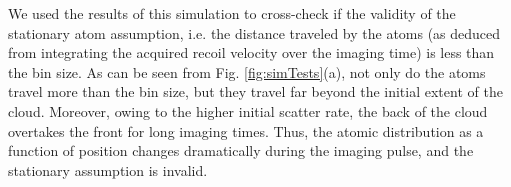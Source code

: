 \documentclass[12pt]{iopart}
\begin{document}
\par We used the results of this simulation to cross-check if the validity of the  stationary atom assumption, i.e. the distance traveled by the atoms (as deduced from integrating the acquired recoil velocity over the imaging time) is less than the bin size. As can be seen from Fig. \ref{fig:simTests}(a), not only do the atoms travel more than the bin size, but they travel far beyond the initial extent of the cloud. Moreover, owing to the higher initial scatter rate, the back of the cloud overtakes the front for long imaging times. Thus, the atomic distribution as a function of position changes dramatically during the imaging pulse, and the stationary assumption is invalid.
\begin{figure}

\end{figure}
\end{document}
